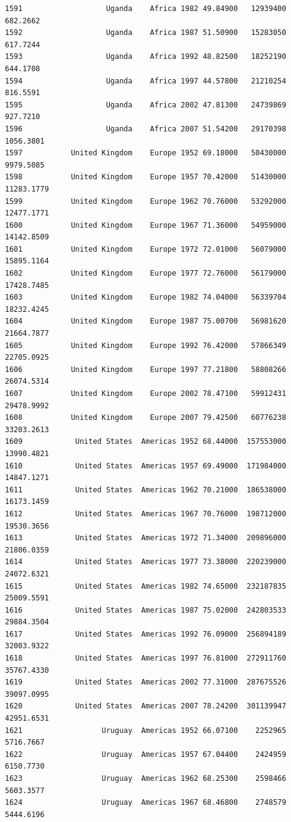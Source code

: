 \documentclass[
  letterpaper,
  DIV=11,
  numbers=noendperiod]{scrreprt}
\begin{document}
\begin{verbatim}
1591                   Uganda    Africa 1982 49.84900   12939400    682.2662
1592                   Uganda    Africa 1987 51.50900   15283050    617.7244
1593                   Uganda    Africa 1992 48.82500   18252190    644.1708
1594                   Uganda    Africa 1997 44.57800   21210254    816.5591
1595                   Uganda    Africa 2002 47.81300   24739869    927.7210
1596                   Uganda    Africa 2007 51.54200   29170398   1056.3801
1597           United Kingdom    Europe 1952 69.18000   50430000   9979.5085
1598           United Kingdom    Europe 1957 70.42000   51430000  11283.1779
1599           United Kingdom    Europe 1962 70.76000   53292000  12477.1771
1600           United Kingdom    Europe 1967 71.36000   54959000  14142.8509
1601           United Kingdom    Europe 1972 72.01000   56079000  15895.1164
1602           United Kingdom    Europe 1977 72.76000   56179000  17428.7485
1603           United Kingdom    Europe 1982 74.04000   56339704  18232.4245
1604           United Kingdom    Europe 1987 75.00700   56981620  21664.7877
1605           United Kingdom    Europe 1992 76.42000   57866349  22705.0925
1606           United Kingdom    Europe 1997 77.21800   58808266  26074.5314
1607           United Kingdom    Europe 2002 78.47100   59912431  29478.9992
1608           United Kingdom    Europe 2007 79.42500   60776238  33203.2613
1609            United States  Americas 1952 68.44000  157553000  13990.4821
1610            United States  Americas 1957 69.49000  171984000  14847.1271
1611            United States  Americas 1962 70.21000  186538000  16173.1459
1612            United States  Americas 1967 70.76000  198712000  19530.3656
1613            United States  Americas 1972 71.34000  209896000  21806.0359
1614            United States  Americas 1977 73.38000  220239000  24072.6321
1615            United States  Americas 1982 74.65000  232187835  25009.5591
1616            United States  Americas 1987 75.02000  242803533  29884.3504
1617            United States  Americas 1992 76.09000  256894189  32003.9322
1618            United States  Americas 1997 76.81000  272911760  35767.4330
1619            United States  Americas 2002 77.31000  287675526  39097.0995
1620            United States  Americas 2007 78.24200  301139947  42951.6531
1621                  Uruguay  Americas 1952 66.07100    2252965   5716.7667
1622                  Uruguay  Americas 1957 67.04400    2424959   6150.7730
1623                  Uruguay  Americas 1962 68.25300    2598466   5603.3577
1624                  Uruguay  Americas 1967 68.46800    2748579   5444.6196

\end{verbatim}
\end{document}
